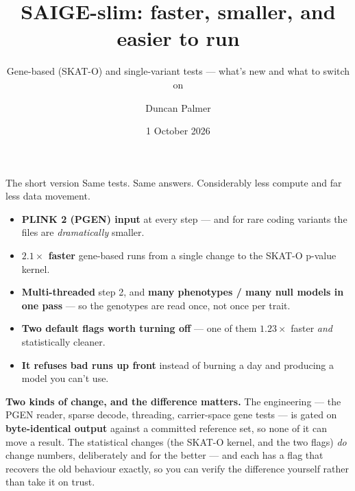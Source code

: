 \documentclass[aspectratio=169,11pt]{beamer}
\title{SAIGE-slim: faster, smaller, and easier to run}
\subtitle{Gene-based (SKAT-O) and single-variant tests --- what's new and what to switch on}
\date{1 October 2026}
\author{Duncan Palmer}
\newcommand{\win}[1]{\textcolor{good}{\textbf{#1}}}
\begin{document}
\maketitle

\begin{frame}{The short version}
Same tests. Same answers. Considerably less compute and far less data movement.

\medskip
\begin{itemize}
  \item \win{PLINK 2 (PGEN) input} at every step --- and for rare coding variants
        the files are \emph{dramatically} smaller.
  \item \win{$2.1\times$ faster} gene-based runs from a single change to the
        SKAT-O p-value kernel.
  \item \win{Multi-threaded} step 2, and \win{many phenotypes / many null models
        in one pass} --- so the genotypes are read once, not once per trait.
  \item \win{Two default flags worth turning off} --- one of them $1.23\times$
        faster \emph{and} statistically cleaner.
  \item \win{It refuses bad runs up front} instead of burning a day and
        producing a model you can't use.
\end{itemize}

\medskip
\textbf{Two kinds of change, and the difference matters.} The engineering --- the
PGEN reader, sparse decode, threading, carrier-space gene tests --- is gated on
\textbf{byte-identical output} against a committed reference set, so none of it
can move a result. The statistical changes (the SKAT-O kernel, and the two flags)
\emph{do} change numbers, deliberately and for the better --- and each has a flag
that recovers the old behaviour exactly, so you can verify the difference
yourself rather than take it on trust.
\end{frame}
\end{document}
